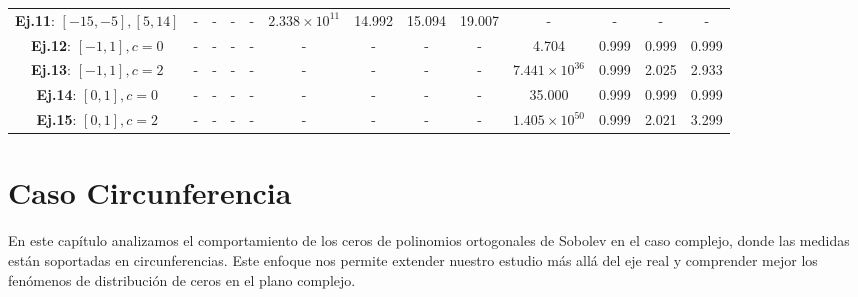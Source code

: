 \begin{table}
\begin{tabular}{|c|cccc|cccc|cccc|}
		\textbf{Ej.11}: $[-15,-5], [5,14]$         & -                                             & -                                                & -                                   & -        & $2.338\times10^{11}$ & 14.992         & 15.094                  & 19.007   & -                    & -              & -                       & -        \\
		\textbf{Ej.12}: $[-1,1], c=0$              & -                                             & -                                                & -                                   & -        & -                    & -              & -                       & -        & 4.704                & 0.999          & 0.999                   & 0.999    \\
		\textbf{Ej.13}: $[-1,1], c=2$              & -                                             & -                                                & -                                   & -        & -                    & -              & -                       & -        & $7.441\times10^{36}$ & 0.999          & 2.025                   & 2.933    \\
		\textbf{Ej.14}: $[0,1], c=0$               & -                                             & -                                                & -                                   & -        & -                    & -              & -                       & -        & 35.000               & 0.999          & 0.999                   & 0.999    \\
		\textbf{Ej.15}: $[0,1], c=2$               & -                                             & -                                                & -                                   & -        & -                    & -              & -                       & -        & $1.405\times10^{50}$ & 0.999          & 2.021                   & 3.299    \\
		\hline
	\end{tabular}
\end{table}

\newpage

\section{Caso Circunferencia}

En este capítulo analizamos el comportamiento de los ceros de polinomios ortogonales de Sobolev en el caso complejo, donde las medidas están soportadas en circunferencias. Este enfoque nos permite extender nuestro estudio más allá del eje real y comprender mejor los fenómenos de distribución de ceros en el plano complejo.

